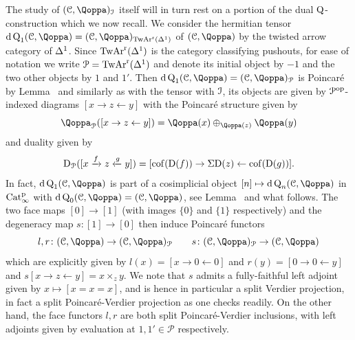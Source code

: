 The study of $(\C,\QF)_\I$ itself will in turn rest on a portion of %
the dual $\operatorname{Q}$-construction which we now recall. We consider the hermitian tensor $\dualQ_1(\C,\QF) = (\C,\QF)_{\Twar(\Del^1)}$ of $(\C,\QF)$ by the twisted arrow category of $\Delta^1$. Since $\operatorname{TwAr}^{\mathrm{r}}(\Delta^1)$ is the category classifying pushouts, for ease of notation we write $\mathcal{P} = \operatorname{TwAr}^{\mathrm{r}}(\Delta^1)$ and denote its initial object by $-1$ and the two other objects by $1$ and $1'$.
Then $\dualQ_1(\C,\QF) = (\C,\QF)_{\mathcal{P}}$ is Poincaré by Lemma~ and similarly as with the tensor with $\mathcal{I}$, its objects are given by $\mathcal{P}^\mathrm{op}$-indexed diagrams $[x \rightarrow z \leftarrow y]$ with the Poincaré structure given by
\[
\QF_{\mathcal{P}}([x \rightarrow z \leftarrow y]) = \QF(x) \oplus_{\QF(z)} \QF(y)
\]
and duality given by 
\[
\mathrm{D}_{\mathcal{P}}([x \xrightarrow{f} z \xleftarrow{g} y]) = [\operatorname{cof}(\mathrm{D}(f)) \rightarrow \Sigma \mathrm{D}(z) \leftarrow \operatorname{cof}(\mathrm{D}(g))].
\]
In fact, $\dualQ_1(\C,\QF)$ is part of a cosimplicial object $[n] \mapsto \dualQ_n(\C,\QF)$ in $\mathrm{Cat}^{\mathrm p}_\infty$ with $\dualQ_0(\C,\QF) = (\C,\QF)$, see Lemma~ and what follows. The two face maps $[0] \to [1]$ (with images $\{0\}$ and $\{1\}$ respectively) and the degeneracy map $s\colon [1] \to [0]$ then induce Poincaré functors
\[
l,r\colon (\C,\QF) \to (\C,\QF)_{\mathcal{P}} \quad\quad s\colon (\C,\QF)_{\mathcal{P}} \to (\C,\QF)
\]
which are explicitly given by $l(x) = [x \rightarrow 0 \leftarrow 0]$ and $r(y) = [0 \rightarrow 0 \leftarrow y]$ and $s[x \rightarrow z \leftarrow y] = x \times_z y$. We note that $s$ admits a fully-faithful left adjoint given by $x \mapsto [x = x = x]$, and is hence in particular a split Verdier projection, in fact a split Poincar\'e-Verdier projection as one checks readily. On the other hand, the face functors $l,r$ are both split Poincaré-Verdier inclusions, with left adjoints given by evaluation at $1,1' \in \mathcal{P}$ respectively. %




